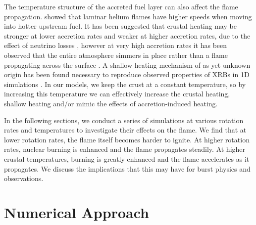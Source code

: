 \documentclass[preprint,times,tighten]{aastex63}
\begin{document}
The temperature structure of the accreted fuel layer can also affect
the flame propagation.  \citet{Timmes00} showed that laminar helium flames 
have higher speeds when moving into hotter upstream fuel.
It has been suggested that crustal heating may be stronger at lower
accretion rates and weaker at higher accretion rates, due to the
effect of neutrino losses \citep{Cumming2006,johnston:2019}, however at 
very high accretion rates it has been observed that the entire atmosphere 
simmers in place rather than a flame propagating across the surface \citep{fujimoto1981,bildsten1998thermonuclear,keek2009effect}. 
A shallow heating
mechanism of as yet unknown origin has been found necessary to
reproduce observed properties of XRBs in 1D simulations
\citep{Deibel2015,Turlione2015,Keek2017}.
In our
models, we keep the crust at a constant temperature, so by increasing
this temperature we can effectively increase the crustal heating, shallow heating
and/or
mimic the effects of accretion-induced heating. 

In the following sections, we conduct a series of simulations at various rotation 
rates and temperatures to investigate their effects on the flame. We find that 
at lower rotation rates, the flame itself becomes harder to ignite. At higher 
rotation rates, nuclear burning is enhanced and the flame propagates steadily. 
At higher crustal temperatures, burning is greatly enhanced and the flame accelerates as 
it propagates. We discuss the implications that this may have for burst physics 
and observations. 


\section{Numerical Approach}\label{Sec:numerics}
\end{document}

